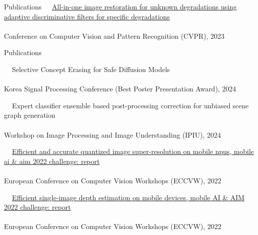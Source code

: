 \documentclass{resume} %
\newcommand{\mycolor}[1]{\textcolor{myurlcolor}{#1}}
\begin{document}
\begin{rSection}{Publications {}}
\textbullet~\,\, \href{https://ieeexplore.ieee.org/document/10204770}{All-in-one image restoration for unknown degradations using adaptive discriminative filters for specific degradations}
\\ 
\\ \hspace*{1.5em}Conference on Computer Vision and Pattern Recognition (CVPR), 2023

\end{rSection}




\begin{rSection}{Publications {}}


\textbullet~\,\, {\mycolor{Selective Concept Erasing for Safe Diffusion Models}}
\\ 
\\ \hspace*{1.5em}Korea Signal Processing Conference (Best Poster Presentation Award), 2024


\textbullet~\,\, {\mycolor{Expert classifier ensemble based post-processing correction for unbiased scene graph generation}}
\\ 
\\ \hspace*{1.5em}Workshop on Image Processing and Image Understanding (IPIU), 2024


\textbullet~\,\, \href{https://link.springer.com/chapter/10.1007/978-3-031-25066-8_4}{Efficient and accurate quantized image super-resolution on mobile npus, mobile ai \& aim 2022 challenge: report
}
\\ 
\\ \hspace*{1.5em}European Conference on Computer Vision Workshops (ECCVW), 2022


\textbullet~\,\, \href{https://link.springer.com/chapter/10.1007/978-3-031-25066-8_4}{Efficient single-image depth estimation on mobile devices, mobile AI \& AIM 2022 challenge: report}
\\ 
\\ \hspace*{1.5em}European Conference on Computer Vision Workshops (ECCVW), 2022



\end{rSection}
\end{document}
